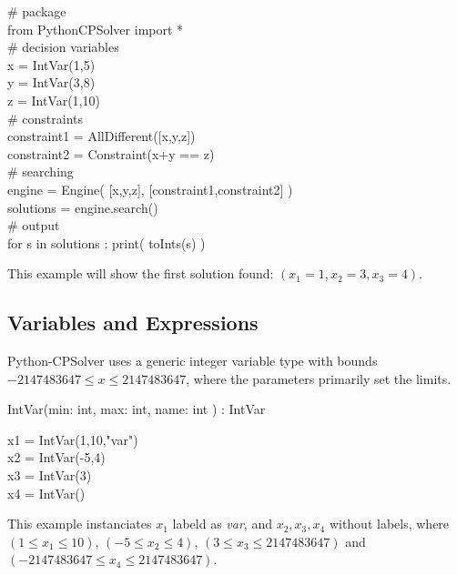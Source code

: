 \documentclass{article}
\newcommand{\cmd}[1] {{\color{teal}  #1}}
\newcommand{\ope}[1] {{\color{purple}#1}}
\newcommand{\cmt}[1] {{\color{violet}#1}}
\newcommand{\definition}[1] {
    \begin{tcolorbox}[colback=white,colframe=mygray,sharp corners=all,top=0.01cm,bottom=0.01cm,left=0.1cm]
        {\fontfamily{pcr}\selectfont #1}
    \end{tcolorbox}
}
\newcommand{\code}[1] {
    \begin{tcolorbox}[colback=mygray,colframe=mygray,sharp corners=all,top=0.01cm,bottom=0.01cm,left=0.1cm]
        \small
        {\fontfamily{pcr}\selectfont
        #1
        }

    \end{tcolorbox}
}
\begin{document}
\code{
    \cmt{\# package} \\
    \cmd{from} PythonCPSolver \cmd{import} \ope{*} \\

    \cmt{\# decision variables} \\
    x \ope{=} IntVar(1,5) \\
    y \ope{=} IntVar(3,8) \\
    z \ope{=} IntVar(1,10) \\

    \cmt{\# constraints} \\
    constraint1 \ope{=} AllDifferent([x,y,z]) \\
    constraint2 \ope{=} Constraint(x\ope{+}y \ope{==} z) \\
    
    \cmt{\# searching} \\
    engine \ope{=} Engine( [x,y,z], [constraint1,constraint2] ) \\    
    solutions \ope{=} engine.search() \\

    \cmt{\# output} \\
    \cmd{for} s \cmd{in} solutions : print( toInts(s) ) 
}

This example will show the first solution found: $(x_1=1, x_2=3, x_3=4)$.

\subsection{Variables and Expressions}\label{sec:variables}

Python-CPSolver uses a generic integer variable type with bounds $-2147483647 \leqslant x \leqslant 2147483647$, where the parameters primarily set the limits.\\

\definition{ IntVar(min:\cmd{int}, max:\cmd{int}, name:\cmd{int} ) : IntVar}

\code{
    x1 \ope{=} IntVar(1,10,"var")\\
    x2 \ope{=} IntVar(-5,4)\\
    x3 \ope{=} IntVar(3) \\
    x4 \ope{=} IntVar()
}

This example instanciates $x_1$ labeld as \textit{var}, and $x_2,x_3,x_4$ without labels, where $(1 \leqslant x_1 \leqslant 10)$, $(-5 \leqslant x_2 \leqslant 4)$, $(3 \leqslant x_3 \leqslant 2147483647)$ and $(-2147483647 \leqslant x_4 \leqslant 2147483647)$.\\
\end{document}
